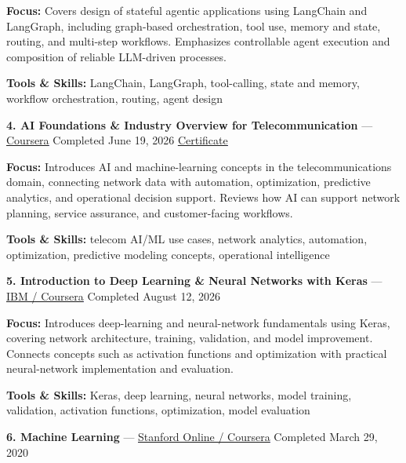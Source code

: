 \documentclass[9pt,letterpaper]{extarticle}
\begin{document}
\textbf{Focus:} Covers design of stateful agentic applications using LangChain and LangGraph, including graph-based orchestration, tool use, memory and state, routing, and multi-step workflows. Emphasizes controllable agent execution and composition of reliable LLM-driven processes.\par
{\small\textbf{Tools \& Skills:} LangChain, LangGraph, tool-calling, state and memory, workflow orchestration, routing, agent design\par}
\vspace{2pt}
\noindent\textbf{4. AI Foundations \& Industry Overview for Telecommunication} {\small --- \textcolor{blue}{\underline{\href{https://www.coursera.org/account/accomplishments/verify/3900EVOH4I1Y}{Coursera}}} \textbar{} Completed \textbar{} June 19, 2026 \textbar{} \textcolor{blue}{\underline{\href{https://waseemraza844.github.io/portfolio/certificates/wireless/c1-ai-found-indus-overview.pdf}{Certificate}}}}\par
\textbf{Focus:} Introduces AI and machine-learning concepts in the telecommunications domain, connecting network data with automation, optimization, predictive analytics, and operational decision support. Reviews how AI can support network planning, service assurance, and customer-facing workflows.\par
{\small\textbf{Tools \& Skills:} telecom AI/ML use cases, network analytics, automation, optimization, predictive modeling concepts, operational intelligence\par}
\vspace{2pt}
\noindent\textbf{5. Introduction to Deep Learning \& Neural Networks with Keras} {\small --- \textcolor{blue}{\underline{\href{https://www.coursera.org/account/accomplishments/verify/Y6NP4GWLS4DZ}{IBM / Coursera}}} \textbar{} Completed \textbar{} August 12, 2026}\par
\textbf{Focus:} Introduces deep-learning and neural-network fundamentals using Keras, covering network architecture, training, validation, and model improvement. Connects concepts such as activation functions and optimization with practical neural-network implementation and evaluation.\par
{\small\textbf{Tools \& Skills:} Keras, deep learning, neural networks, model training, validation, activation functions, optimization, model evaluation\par}
\vspace{2pt}
\noindent\textbf{6. Machine Learning} {\small --- \textcolor{blue}{\underline{\href{https://www.coursera.org/account/accomplishments/verify/VU3Y5TBLVLZT}{Stanford Online / Coursera}}} \textbar{} Completed \textbar{} March 29, 2020}\par
\end{document}
